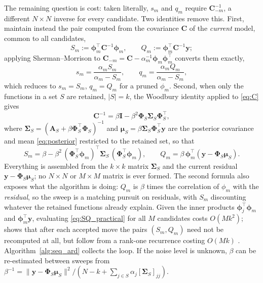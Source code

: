 \documentclass[a4paper]{article}
\renewcommand{\vec}[1]{\boldsymbol{#1}}
\begin{document}
The remaining question is cost: taken literally, $s_m$ and $q_m$ require $\mathbf C_{-m}^{-1}$, a different $N \times N$ inverse for every candidate. Two identities remove this. First, maintain instead the pair computed from the covariance $\mathbf C$ of the \emph{current} model, common to all candidates,
\begin{equation} \label{eq:SQ}
    S_m := \vec \phi_m^\top \mathbf C^{-1} \vec \phi_m,
    \qquad
    Q_m := \vec \phi_m^\top \mathbf C^{-1} \mathbf y;
\end{equation}
applying Sherman--Morrison to $\mathbf C_{-m} = \mathbf C - \alpha_m^{-1} \vec \phi_m \vec \phi_m^\top$ converts them exactly,
\begin{equation} \label{eq:sq_from_SQ}
    s_m = \frac{\alpha_m S_m}{\alpha_m - S_m},
    \qquad
    q_m = \frac{\alpha_m Q_m}{\alpha_m - S_m},
\end{equation}
which reduces to $s_m = S_m$, $q_m = Q_m$ for a pruned $\phi_m$. Second, when only the functions in a set $S$ are retained, $|S| = k$, the Woodbury identity applied to \eqref{eq:C} gives
\begin{equation}
    \mathbf C^{-1} = \beta \mathbf I - \beta^2 \mathbf \Phi_S \mathbf \Sigma_S \mathbf \Phi_S^\top,
\end{equation}
where $\mathbf \Sigma_S = (\mathbf A_S + \beta \mathbf \Phi_S^\top \mathbf \Phi_S)^{-1}$ and $\vec \mu_S = \beta \mathbf \Sigma_S \mathbf \Phi_S^\top \mathbf y$ are the posterior covariance and mean \eqref{eq:posterior} restricted to the retained set, so that
\begin{equation} \label{eq:SQ_practical}
    S_m = \beta - \beta^2 \, (\mathbf \Phi_S^\top \vec \phi_m)^\top \mathbf \Sigma_S \, (\mathbf \Phi_S^\top \vec \phi_m),
    \qquad
    Q_m = \beta \, \vec \phi_m^\top (\mathbf y - \mathbf \Phi_S \vec \mu_S).
\end{equation}
Everything is assembled from the $k \times k$ matrix $\mathbf \Sigma_S$ and the current residual $\mathbf y - \mathbf \Phi_S \vec \mu_S$; no $N \times N$ or $M \times M$ matrix is ever formed. The second formula also exposes what the algorithm is doing: $Q_m$ is $\beta$ times the correlation of $\phi_m$ with the \emph{residual}, so the sweep is a matching pursuit on residuals, with $S_m$ discounting whatever the retained functions already explain. Given the inner products $\vec \phi_j^\top \vec \phi_m$ and $\vec \phi_m^\top \mathbf y$, evaluating \eqref{eq:SQ_practical} for all $M$ candidates costs $O(M k^2)$;  shows that after each accepted move the pairs $(S_m, Q_m)$ need not be recomputed at all, but follow from a rank-one recurrence costing $O(Mk)$ \autocite{tipping2003fast}. Algorithm~\ref{alg:seq_ard} collects the loop. If the noise level is unknown, $\beta$ can be re-estimated between sweeps from $\beta^{-1} = \|\mathbf y - \mathbf \Phi_S \vec \mu_S\|^2 / (N - k + \sum_{j \in S} \alpha_j [\mathbf \Sigma_S]_{jj})$.
\end{document}
